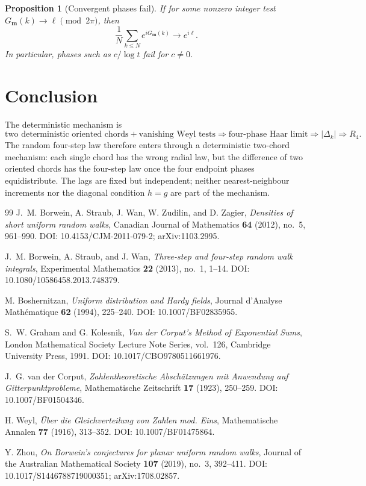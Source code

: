 \documentclass[11pt]{amsart}
\numberwithin{equation}{section}
\theoremstyle{plain}
\newtheorem{proposition}[theorem]{Proposition}
\theoremstyle{definition}
\theoremstyle{remark}
\begin{document}
\begin{proposition}[Convergent phases fail]
\label{prop:convergent_phases}
If for some nonzero integer test \(G_{\mathbf m}(k)\to\ell\pmod{2\pi}\), then
\begin{equation}
\frac1N\sum_{k\leq N}e^{iG_{\mathbf m}(k)}\longrightarrow e^{i\ell}.
\label{eq:convergent_phase_average}
\end{equation}
In particular, phases such as \(c/\log t\) fail for \(c\neq0\).
\end{proposition}

\section{Conclusion}
\label{sec:conclusion}
The deterministic mechanism is
\begin{equation}
\text{two deterministic oriented chords}
+\text{vanishing Weyl tests}
\Longrightarrow
\text{four-phase Haar limit}
\Longrightarrow
|\Delta_k|\Rightarrow R_4.
\label{eq:conclusion_mechanism}
\end{equation}
The random four-step law therefore enters through a deterministic two-chord mechanism: each single chord has the wrong radial law, but the difference of two oriented chords has the four-step law once the four endpoint phases equidistribute. The lags are fixed but independent; neither nearest-neighbour increments nor the diagonal condition \(h=g\) are part of the mechanism.

\begin{thebibliography}{99}
J.~M. Borwein, A. Straub, J. Wan, W. Zudilin, and D. Zagier,
\emph{Densities of short uniform random walks},
Canadian Journal of Mathematics \textbf{64} (2012), no.~5, 961--990.
DOI: 10.4153/CJM-2011-079-2; arXiv:1103.2995.

J.~M. Borwein, A. Straub, and J. Wan,
\emph{Three-step and four-step random walk integrals},
Experimental Mathematics \textbf{22} (2013), no.~1, 1--14.
DOI: 10.1080/10586458.2013.748379.

M. Boshernitzan,
\emph{Uniform distribution and Hardy fields},
Journal d'Analyse Mathématique \textbf{62} (1994), 225--240.
DOI: 10.1007/BF02835955.

S.~W. Graham and G. Kolesnik,
\emph{Van der Corput's Method of Exponential Sums},
London Mathematical Society Lecture Note Series, vol.~126,
Cambridge University Press, 1991.
DOI: 10.1017/CBO9780511661976.

J.~G. van der Corput,
\emph{Zahlentheoretische Abschätzungen mit Anwendung auf Gitterpunktprobleme},
Mathematische Zeitschrift \textbf{17} (1923), 250--259.
DOI: 10.1007/BF01504346.

H. Weyl,
\emph{Über die Gleichverteilung von Zahlen mod. Eins},
Mathematische Annalen \textbf{77} (1916), 313--352.
DOI: 10.1007/BF01475864.

Y. Zhou,
\emph{On Borwein's conjectures for planar uniform random walks},
Journal of the Australian Mathematical Society \textbf{107} (2019), no.~3, 392--411.
DOI: 10.1017/S1446788719000351; arXiv:1708.02857.
\end{thebibliography}
\end{document}
